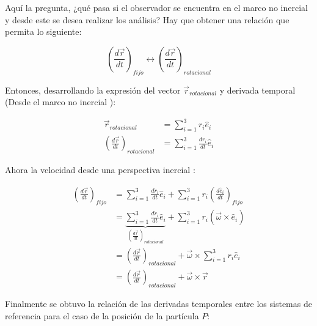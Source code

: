 \documentclass[/home/hernan/Documentos/Apuntes_mecanica_teorica/main.tex]{subfiles}
\begin{document}
	Aquí la pregunta, ¿qué pasa si el observador se encuentra en el marco no inercial y desde este se desea realizar los análisis? Hay que obtener una relación que permita lo siguiente:

	\begin{equation*}
		\left( \frac{d \vec{r}}{dt} \right)_{fijo} \leftrightarrow \left( \frac{d \vec{r}}{dt} \right)_{rotacional}
	\end{equation*}

	Entonces, desarrollando la expresión del vector $\vec{r}_{rotacional}$ y derivada temporal (Desde el marco no inercial ):

	\begin{align*}
		\vec{r}_{rotacional} &= \sum_{i=1}^{3} r_{i}\hat{e}_{i} \\
		\left( \frac{d \vec{r}}{dt} \right)_{rotacional} &= \sum_{i=1}^{3} \frac{d r_{i}}{dt} \hat{e}_{i}
	\end{align*}

	Ahora la velocidad desde una perspectiva inercial :

	\begin{align*}
		\left( \frac{d \vec{r}}{dt} \right)_{fijo} &=  \sum_{i=1}^{3} \frac{d r_{i}}{dt} \hat{e}_{i} + \sum_{i=1}^{3} r_{i} \left( \frac{d \hat{e}_{i}}{dt}\right)_{fijo} \\ 
		&= \underbrace{\sum_{i=1}^{3} \frac{d r_{i}}{dt} \hat{e}_{i}}_{\left( \frac{d \vec{r}}{dt} \right)_{rotacional}} + \sum_{i=1}^{3} r_{i} \left(\vec{\omega} \times \hat{e}_{i} \right) \\
		&=  \left( \frac{d \vec{r}}{dt} \right)_{rotacional} + \vec{\omega} \times \sum_{i=1}^{3} r_{i} \hat{e}_{i} \\ 
		&= \left( \frac{d \vec{r}}{dt} \right)_{rotacional} + \vec{\omega} \times \vec{r}
	\end{align*}

	Finalmente se obtuvo la relación de las derivadas temporales entre los sistemas de referencia para el caso de la posición de la partícula $P$:
\end{document}
